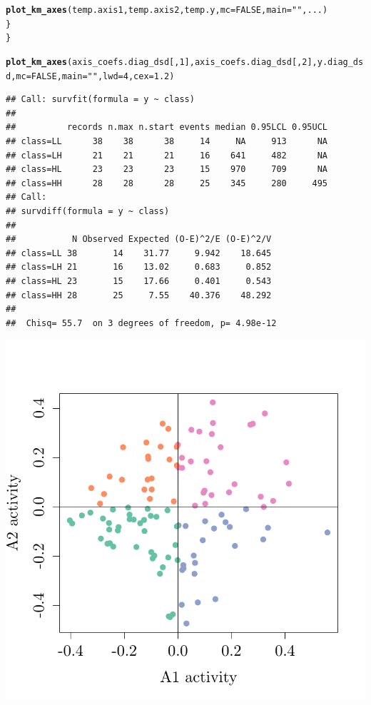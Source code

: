 \documentclass{article}\usepackage[]{graphicx}\usepackage[]{color}
\makeatletter
\def\maxwidth{ %
  \ifdim\Gin@nat@width>\linewidth
    \linewidth
  \else
    \Gin@nat@width
  \fi
}
\newcommand{\hlnum}[1]{\textcolor[rgb]{0.686,0.059,0.569}{#1}}%
\newcommand{\hlstr}[1]{\textcolor[rgb]{0.192,0.494,0.8}{#1}}%
\newcommand{\hlstd}[1]{\textcolor[rgb]{0.345,0.345,0.345}{#1}}%
\newcommand{\hlkwc}[1]{\textcolor[rgb]{0.333,0.667,0.333}{#1}}%
\newcommand{\hlkwd}[1]{\textcolor[rgb]{0.737,0.353,0.396}{\textbf{#1}}}%
\newenvironment{kframe}{%
 \def\at@end@of@kframe{}%
 \ifinner\ifhmode%
  \def\at@end@of@kframe{\end{minipage}}%
  \begin{minipage}{\columnwidth}%
 \fi\fi%
 \def\FrameCommand##1{\hskip\@totalleftmargin \hskip-\fboxsep
 \colorbox{shadecolor}{##1}\hskip-\fboxsep
     \hskip-\linewidth \hskip-\@totalleftmargin \hskip\columnwidth}%
 \MakeFramed {\advance\hsize-\width
   \@totalleftmargin\z@ \linewidth\hsize
   \@setminipage}}%
 {\par\unskip\endMakeFramed%
 \at@end@of@kframe}
\newenvironment{knitrout}{}{} %
\makeatother
\begin{document}
\begin{knitrout}
\begin{kframe}
\begin{alltt}
                \hlkwd{plot_km_axes}\hlstd{(temp.axis1, temp.axis2, temp.y,} \hlkwc{mc} \hlstd{=} \hlnum{FALSE}\hlstd{,} \hlkwc{main} \hlstd{=} \hlstr{""}\hlstd{, ...)}
        \hlstd{\}}
\hlstd{\}}

\hlkwd{plot_km_axes}\hlstd{(axis_coefs.diag_dsd[,}\hlnum{1}\hlstd{], axis_coefs.diag_dsd[,}\hlnum{2}\hlstd{], y.diag_dsd,} \hlkwc{mc} \hlstd{=} \hlnum{FALSE}\hlstd{,} \hlkwc{main} \hlstd{=} \hlstr{""}\hlstd{,} \hlkwc{lwd} \hlstd{=} \hlnum{4}\hlstd{,} \hlkwc{cex} \hlstd{=} \hlnum{1.2}\hlstd{)}
\end{alltt}
\begin{verbatim}
## Call: survfit(formula = y ~ class)
## 
##          records n.max n.start events median 0.95LCL 0.95UCL
## class=LL      38    38      38     14     NA     913      NA
## class=LH      21    21      21     16    641     482      NA
## class=HL      23    23      23     15    970     709      NA
## class=HH      28    28      28     25    345     280     495
## Call:
## survdiff(formula = y ~ class)
## 
##           N Observed Expected (O-E)^2/E (O-E)^2/V
## class=LL 38       14    31.77     9.942    18.645
## class=LH 21       16    13.02     0.683     0.852
## class=HL 23       15    17.66     0.401     0.543
## class=HH 28       25     7.55    40.376    48.292
## 
##  Chisq= 55.7  on 3 degrees of freedom, p= 4.98e-12
\end{verbatim}
\end{kframe}

{\centering \includegraphics[width=\maxwidth]{figure/km-curves-1} 

}
\end{knitrout}
\end{document}
